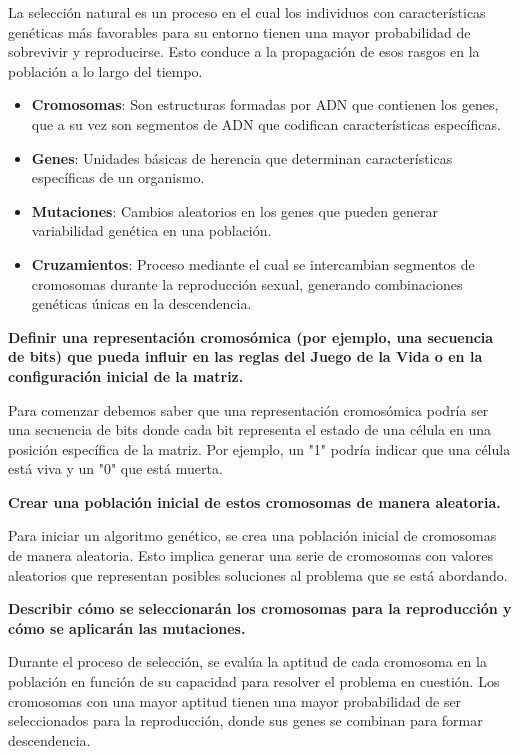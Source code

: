 La selección natural es un proceso en el cual los individuos con características genéticas más favorables para su entorno tienen una mayor probabilidad de sobrevivir y reproducirse. Esto conduce a la propagación de esos rasgos en la población a lo largo del tiempo.

\begin{itemize}
    \item \textbf{Cromosomas}: Son estructuras formadas por ADN que contienen los genes, que a su vez son segmentos de ADN que codifican características específicas.
  
    \item \textbf{Genes}: Unidades básicas de herencia que determinan características específicas de un organismo.
  
    \item \textbf{Mutaciones}: Cambios aleatorios en los genes que pueden generar variabilidad genética en una población.
  
    \item \textbf{Cruzamientos}: Proceso mediante el cual se intercambian segmentos de cromosomas durante la reproducción sexual, generando combinaciones genéticas únicas en la descendencia.
\end{itemize}

\textbf{Definir una representación cromosómica (por ejemplo, una secuencia de bits) que pueda influir en las reglas del Juego de la Vida o en la configuración inicial de la matriz.}

Para comenzar debemos saber que una representación cromosómica podría ser una secuencia de bits donde cada bit representa el estado de una célula en una posición específica de la matriz. Por ejemplo, un "1" podría indicar que una célula está viva y un "0" que está muerta.

\textbf{Crear una población inicial de estos cromosomas de manera aleatoria.}

Para iniciar un algoritmo genético, se crea una población inicial de cromosomas de manera aleatoria. Esto implica generar una serie de cromosomas con valores aleatorios que representan posibles soluciones al problema que se está abordando.

\textbf{Describir cómo se seleccionarán los cromosomas para la reproducción y cómo se aplicarán las mutaciones.}

Durante el proceso de selección, se evalúa la aptitud de cada cromosoma en la población en función de su capacidad para resolver el problema en cuestión. Los cromosomas con una mayor aptitud tienen una mayor probabilidad de ser seleccionados para la reproducción, donde sus genes se combinan para formar descendencia.

